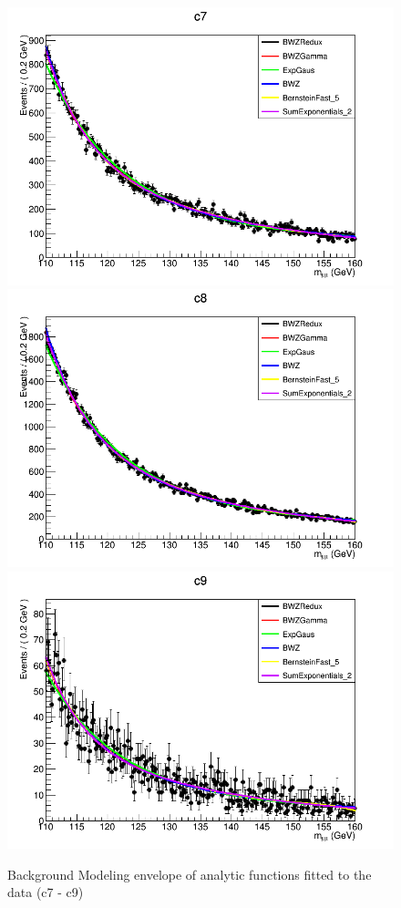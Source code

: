 \begin{figure}[hbp]
  \centering
  \includegraphics[width=0.65\linewidth]{figures/ch_higgs/backgroundmodel/uf_bdt/backgroundFits__c7__bkgModels.png}\\
  \includegraphics[width=0.65\linewidth]{figures/ch_higgs/backgroundmodel/uf_bdt/backgroundFits__c8__bkgModels.png}\\
  \includegraphics[width=0.65\linewidth]{figures/ch_higgs/backgroundmodel/uf_bdt/backgroundFits__c9__bkgModels.png}
  \caption{Background Modeling envelope of analytic functions fitted to the data (c7 - c9)}
  \label{fig:higgs_bmodel_bdtc7c9}
\end{figure}
